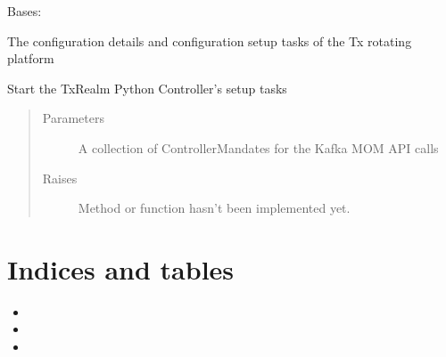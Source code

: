\documentclass[letterpaper,10pt,english]{sphinxmanual}
\begin{document}
\begin{fulllineitems}
\label{\detokenize{TxRealm:TxRealm.TxSetupHandler}}
\sphinxAtStartPar
Bases: {\hyperref[\detokenize{Forge:Forge.SetupHandler}]{}}

\sphinxAtStartPar
The configuration details and configuration setup tasks of the Tx rotating platform

\begin{fulllineitems}
\label{\detokenize{TxRealm:TxRealm.TxSetupHandler.setup}}
\sphinxAtStartPar
Start the TxRealm Python Controller’s setup tasks
\begin{quote}\begin{description}
\item[{Parameters}] \leavevmode
\sphinxAtStartPar
{} \textendash{} A collection of ControllerMandates for the Kafka MOM API calls

\item[{Raises}] \leavevmode
\sphinxAtStartPar
{} \textendash{} Method or function hasn’t been implemented yet.

\end{description}\end{quote}

\end{fulllineitems}


\end{fulllineitems}



\chapter{Indices and tables}
\label{\detokenize{index:indices-and-tables}}\begin{itemize}
\item {} 
\sphinxAtStartPar
{}

\item {} 
\sphinxAtStartPar
{}

\item {} 
\sphinxAtStartPar
{}

\end{itemize}
\end{document}
